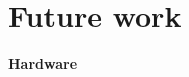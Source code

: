 \chapter{Future work}
\label{chap:FutureWork}
\textbf{Hardware}\newline
\textbf{}\newline

\textbf{}\newline